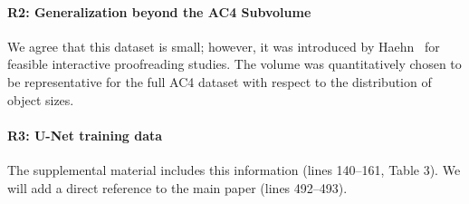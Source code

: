 \documentclass[10pt,twocolumn,letterpaper]{article}
\begin{document}
\begin{table}[h]
\caption{Forced Choice User Experiment in adapted Rand Error metric (lower is better). Novices and experts using GP perform better than using FP.}
\label{tab:randerror}
\end{table}

\vspace{-0.3cm}

\paragraph{R2: Generalization beyond the AC4 Subvolume} We agree that this dataset is small; however, it was introduced by Haehn~ for feasible interactive proofreading studies. The volume was quantitatively chosen to be representative for the full AC4 dataset with respect to the distribution of object sizes.

\paragraph{R3: U-Net training data} The supplemental material includes this information (lines 140--161, Table 3). We will add a direct reference to the main paper (lines 492--493).
\end{document}
